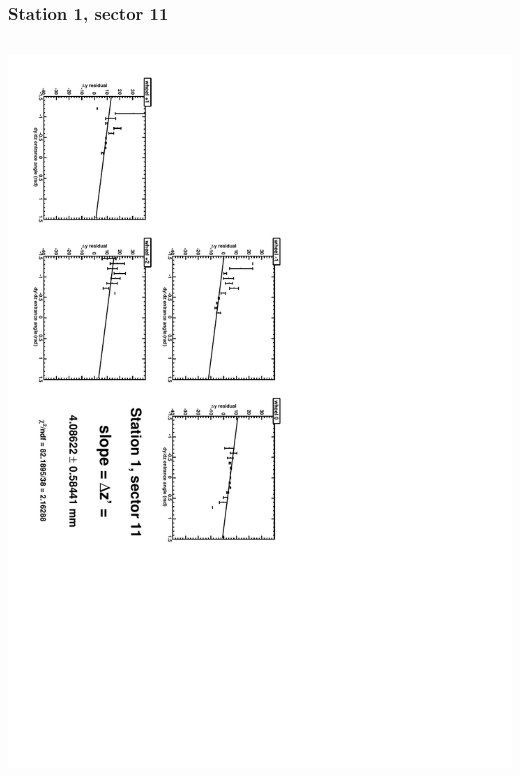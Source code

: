 \documentclass[compress]{beamer}
\begin{document}
\begin{frame}
\frametitle{Station 1, sector 11}
\begin{columns}
\includegraphics[height=\linewidth, angle=90]{zfits/zfit_1_11.pdf}


\end{columns}
\end{frame}
\end{document}
